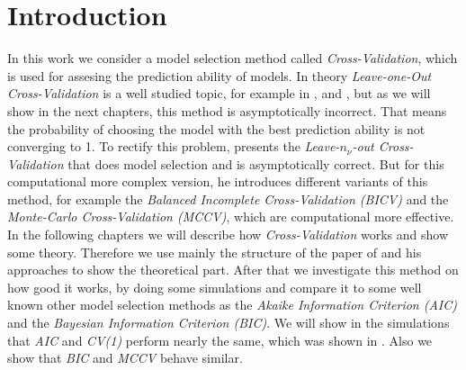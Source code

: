 \documentclass[Research_Module_ES.tex]{subfiles}
\begin{document}
\section{Introduction}	
In this work we consider a model selection method  called \textit{Cross-Validation}, which is used for assesing the prediction ability of models.
In theory \textit{Leave-one-Out Cross-Validation} is a well studied topic, for example in \cite{geisser1975predictive}, \cite{stone1974cross} and \cite{stone1977asymptotic}, but as we will show in the next chapters, this method is asymptotically incorrect. That means the probability of choosing the model with the best prediction ability is not converging to 1.
To rectify this problem, \cite{shao} presents the \textit{Leave-$n_\nu$-out Cross-Validation} that does model selection and is asymptotically correct. But for this computational more complex version, he introduces different variants of this method, for example the \textit{Balanced Incomplete Cross-Validation (BICV)} and the \textit{Monte-Carlo Cross-Validation (MCCV)}, which are computational more effective. In the following chapters we will describe how \textit{Cross-Validation} works and show some theory. Therefore we use mainly the structure of the paper of \cite{shao} and his approaches to show the theoretical part. After that we investigate this method on how good it works, by doing some simulations and compare it to some well known other model selection methods as the \textit{Akaike Information Criterion (AIC)} and the \textit{Bayesian Information Criterion (BIC)}.
We will show in the simulations that \textit{AIC} and \textit{CV(1)} perform nearly the same, which was shown in \cite{stone1977asymptotic}. Also we show that \textit{BIC} and \textit{MCCV} behave similar.
\end{document}
